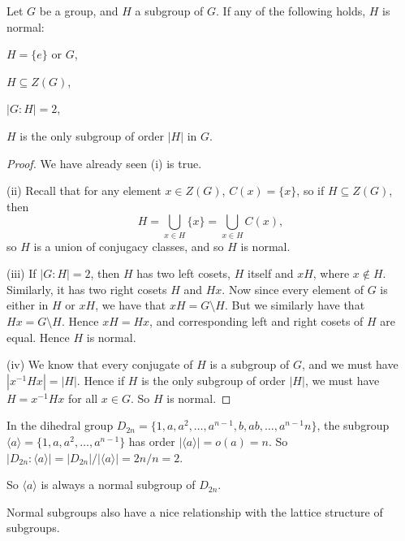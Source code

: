\begin{theorem}\label{thm:normalconditions}
  Let $G$ be a group, and $H$ a subgroup of $G$.  If any
  of the following holds, $H$ is normal:
  \begin{theoremenum}
    \item $H = \{e\}$ or $G$,
    \item $H \subseteq Z(G)$,
    \item $|G : H| = 2$,
    \item $H$ is the only subgroup of order $|H|$ in $G$.
  \end{theoremenum}
\end{theorem}
\begin{proof}
  We have already seen (i) is true.
  
  (ii) Recall that for any element $x \in Z(G)$, $C(x) = \{x\}$, so if $H
  \subseteq Z(G)$, then
  \[
    H = \bigcup_{x \in H} \{x\} = \bigcup_{x \in H} C(x),
  \]
  so $H$ is a union of conjugacy classes, and so $H$ is normal.
  
  (iii) If $|G : H| = 2$, then $H$ has two left cosets, $H$ itself and $xH$,
  where $x \notin H$.  Similarly, it has two right cosets $H$ and $Hx$.  Now
  since every element of $G$ is either in $H$ or $xH$, we have that $xH = G
  \setminus H$.  But we similarly have that $Hx = G \setminus H$.  Hence $xH
  = Hx$, and corresponding left and right cosets of $H$ are equal.  Hence
  $H$ is normal.
  
  (iv) We know that every conjugate of $H$ is a subgroup of $G$, and we must
  have $|x^{-1}Hx| = |H|$.  Hence if $H$ is the only subgroup of order $|H|$,
  we must have $H = x^{-1}Hx$ for all $x \in G$.  So $H$ is normal.
\end{proof}

\begin{example}
  In the dihedral group $D_{2n} = \{1, a, a^{2}, \ldots, a^{n-1}, b, ab,
  \ldots, a^{n-1}n\}$, the subgroup $\langle a \rangle = \{1, a, a^{2}, \ldots,
  a^{n-1}\}$ has order $|\langle a \rangle| = o(a) = n$.  So $|D_{2n} :
  \langle a \rangle| = |D_{2n}|/|\langle a \rangle| = 2n/n = 2$.
  
  So $\langle a \rangle$ is always a normal subgroup of $D_{2n}$.
\end{example}

Normal subgroups also have a nice relationship with the lattice structure of
subgroups.


